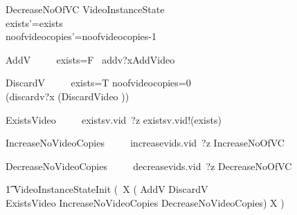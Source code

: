 \documentclass{article}
\begin{document}
\begin{schema}{DecreaseNoOfVC}
   \Delta VideoInstanceState \\
    \where
	exists'=exists\\
	noofvideocopies'=noofvideocopies-1\\
\end{schema}

\begin{circusaction}
     AddV ~~\circdef~~ \lcircguard exists=F \rcircguard  \circguard\ addv?x\then \lschexpract AddVideo \rschexpract \\
\end{circusaction}

\begin{circusaction}
     DiscardV ~~\circdef~~ \lcircguard exists=T \land noofvideocopies=0 \rcircguard  \circguard\\
     					(discardv?x \then (\lschexpract DiscardVideo \rschexpract)) \\
\end{circusaction}

\begin{circusaction}
     ExistsVideo ~~\circdef~~ existsv.vid~?z \then existsv.vid!(exists) \then \Skip \\
\end{circusaction}

\begin{circusaction}
     IncreaseNoVideoCopies ~~\circdef~~ increasevids.vid~?z \then \lschexpract IncreaseNoOfVC \rschexpract \\
\end{circusaction}

\begin{circusaction}
     DecreaseNoVideoCopies ~~\circdef~~ decreasevids.vid~?z \then \lschexpract DecreaseNoOfVC \rschexpract \\
\end{circusaction}

\begin{circusaction}
   \t1 \circspot \lschexpract VideoInstanceStateInit \rschexpract \circseq  (\circmu\ X \circspot (
   					AddV
					\extchoice
					DiscardV\\
					\extchoice
					ExistsVideo
					\extchoice
					IncreaseNoVideoCopies
					\extchoice
					DecreaseNoVideoCopies)
					\circseq X )
\end{circusaction}

\begin{circus}
\circend
\end{circus}
\end{document}
